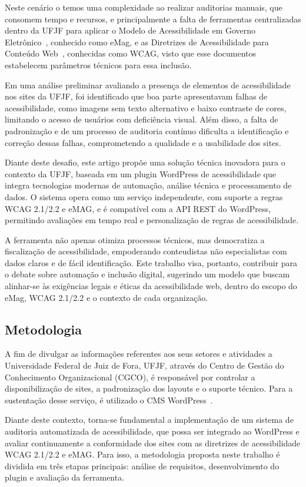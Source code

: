 \documentclass[12pt]{article}
\begin{document}
Neste cenário o temos uma complexidade ao realizar auditorias manuais, que 
consomem tempo e recursos, e principalmente a falta de ferramentas 
centralizadas dentro da UFJF para aplicar o Modelo de Acessibilidade em 
Governo Eletrônico~\cite{emag}, conhecido como eMag, e as Diretrizes 
de Acessibilidade para Conteúdo Web~\cite{wcag22}, conhecidas como 
WCAG, visto que esse documentos estabelecem parâmetros técnicos para essa inclusão.

Em uma análise preliminar avaliando a presença de elementos de acessibilidade nos
sites da UFJF, foi identificado que boa parte apresentavam falhas de acessibilidade, como imagens sem texto
alternativo e baixo contraste de cores, limitando o acesso de usuários com deficiência
visual. Além disso, a falta de padronização e de um processo de auditoria contínuo
dificulta a identificação e correção dessas falhas, comprometendo a qualidade e a
usabilidade dos sites.

Diante deste desafio, este artigo propõe uma solução técnica inovadora para o contexto
da UFJF, baseada em um plugin WordPress de acessibilidade que integra tecnologias
modernas de automação, análise técnica e processamento de dados. O sistema opera
como um serviço independente, com suporte a regras WCAG 2.1/2.2 e eMAG, e é
compatível com a API REST do WordPress, permitindo avaliações em tempo real e
personalização de regras de acessibilidade.

A ferramenta não apenas otimiza processos técnicos, mas democratiza 
a fiscalização de acessibilidade, empoderando conteudistas não especialistas 
com dados claros e de fácil identificação. Este trabalho visa, portanto, contribuir
para o debate sobre automação e inclusão digital, sugerindo um modelo que buscam alinhar-se às exigências legais e éticas da
acessibilidade web, dentro do escopo do eMag, WCAG 2.1/2.2 e o contexto de cada
organização.

\subsection{Metodologia}\label{subsec:metodologia}
A fim de divulgar as informações referentes aos seus setores e atividades a 
Universidade Federal de Juiz de Fora, UFJF, através do Centro de Gestão 
do Conhecimento Organizacional (CGCO), é responsável por controlar a 
disponibilização de sites, a padronização dos layouts e o suporte técnico. Para
a sustentação desse serviço, é utilizado o CMS WordPress~\autocite{WP}.

Diante deste contexto, torna-se fundamental a implementação de um sistema de
auditoria automatizada de acessibilidade, que possa ser integrado ao WordPress e
avaliar continuamente a conformidade dos sites com as diretrizes de acessibilidade
WCAG 2.1/2.2 e eMAG\@. Para isso, a metodologia proposta neste trabalho é dividida
em três etapas principais: análise de requisitos, desenvolvimento do plugin e
avaliação da ferramenta.
\end{document}
